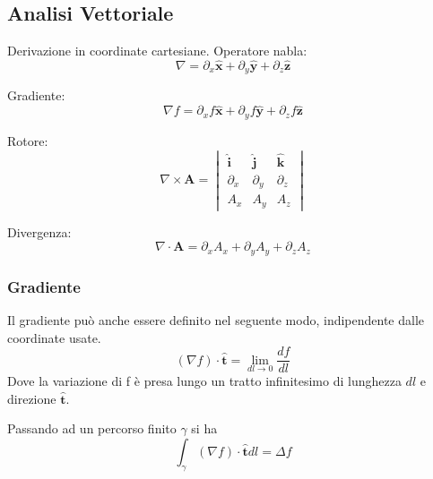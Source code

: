 \documentclass{article}
\newcommand{\mbf}{\mathbf}
\newcommand{\vers}[1]{\mbf{\hat #1 }}
\numberwithin{equation}{section}
\begin{document}

\subsection{Analisi Vettoriale} %
\label{sub:analisi_vettoriale}



Derivazione in coordinate cartesiane. Operatore nabla:
\begin{equation}
    \nabla = \partial_x \vers x + \partial_y \vers y + \partial_z \vers z
\end{equation}

Gradiente: 
\begin{equation}
    \nabla f = \partial_x f \vers x + \partial_y f \vers y + \partial_z f \vers z
\end{equation}

Rotore: 
\begin{equation}
    \nabla \times \mbf A = 
    \begin{vmatrix}
        \vers i     & \vers j       & \vers k       \\
        \partial_x  & \partial_y    & \partial_z    \\
        A_x         & A_y           & A_z
    \end{vmatrix}
\end{equation}

Divergenza: 
\begin{equation}
    \nabla \cdot \mbf A = \partial_x A_x + \partial_y A_y + \partial_z A_z
\end{equation}


\subsubsection{Gradiente} %
\label{ssub:gradiente}


Il gradiente può anche essere definito nel seguente modo, indipendente dalle coordinate usate.
\begin{equation} \label{eq:grad_def}
    ( \nabla f ) \cdot \vers t = \lim_{ dl \to 0 }  \frac{ df }{ dl } 
\end{equation}
Dove la variazione di f è presa lungo un tratto infinitesimo di lunghezza $dl$ e direzione $\vers t$.

Passando ad un percorso finito $\gamma$ si ha 
\begin{equation*}
    \int_\gamma ( \nabla f ) \cdot \vers t dl = \Delta f
\end{equation*}
\end{document}
